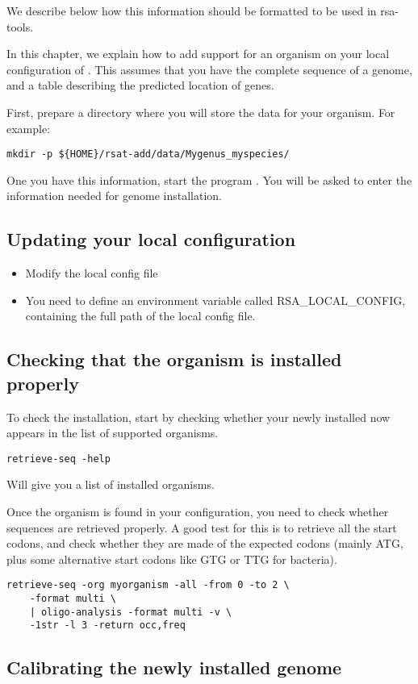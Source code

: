 We describe below how this information should be formatted to be used
in rsa-tools.

In this chapter, we explain how to add support for an organism on your
local configuration of \RSAT. This assumes that you have the complete
sequence of a genome, and a table describing the predicted location of
genes.

First, prepare a directory where you will store the data for your
organism. For example:

\begin{verbatim}
mkdir -p ${HOME}/rsat-add/data/Mygenus_myspecies/
\end{verbatim}


One you have this information, start the program
. You will be asked to enter the information
needed for genome installation.

\subsection{Updating your local configuration}


\begin{itemize}
\item Modify the local config file

\item You need to define an environment variable called
  RSA\_LOCAL\_CONFIG, containing the full path of the local config
  file.

\end{itemize}

\subsection{Checking that the organism is installed properly}

To check the installation, start by checking whether your newly
installed now appears in the list of supported organisms.

\begin{verbatim}
retrieve-seq -help
\end{verbatim}

Will give you a list of installed organisms.

Once the organism is found in your configuration, you need to check
whether sequences are retrieved properly. A good test for this is to
retrieve all the start codons, and check whether they are made of the
expected codons (mainly ATG, plus some alternative start codons like
GTG or TTG for bacteria).

\begin{verbatim}
retrieve-seq -org myorganism -all -from 0 -to 2 \
    -format multi \
    | oligo-analysis -format multi -v \
    -1str -l 3 -return occ,freq
\end{verbatim}

\subsection{Calibrating the newly installed genome}
